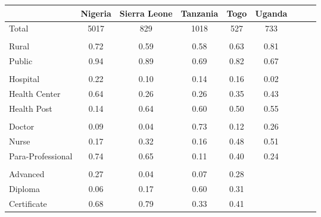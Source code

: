 \def\sym#1{\ifmmode^{#1}\else\(^{#1}\)\fi}
\begin{tabular}{l*{8}{c}}
\hline\hline
&\multicolumn{1}{c}{Nigeria}&\multicolumn{1}{c}{Sierra Leone}&\multicolumn{1}{c}{Tanzania}&\multicolumn{1}{c}{Togo}&\multicolumn{1}{c}{Uganda}&\\
\hline
Total&                                                 {5017}&        {829}&        {1018}&        {527}&       {733}\\
  &  {}\\
Rural&                                                 {0.72}&        {0.59}&        {0.58}&        {0.63}&       {0.81}\\
Public&                                                {0.94}&        {0.89}&        {0.69}&        {0.82}&       {0.67}\\
 &   {}\\
Hospital&                                      {0.22}&        {0.10}&        {0.14}&        {0.16}&       {0.02}\\
Health Center&                                 {0.64}&        {0.26}&        {0.26}&        {0.35}&       {0.43}\\
Health Post&                                   {0.14}&        {0.64}&        {0.60}&        {0.50}&       {0.55}\\
 &   {}\\
Doctor&                                                {0.09}&        {0.04}&        {0.73}&        {0.12}&       {0.26}\\
Nurse&                                                 {0.17}&        {0.32}&        {0.16}&        {0.48}&       {0.51}\\
Para-Professional&                     {0.74}&        {0.65}&        {0.11}&        {0.40}&       {0.24}\\
&   {}\\
Advanced&                                      {0.27}&        {0.04}&        {0.07}&        {0.28}&       {}\\
Diploma&                                               {0.06}&        {0.17}&        {0.60}&        {0.31}&       {}\\
Certificate&                                   {0.68}&        {0.79}&        {0.33}&        {0.41}&       {}\\
\hline
\end{tabular}